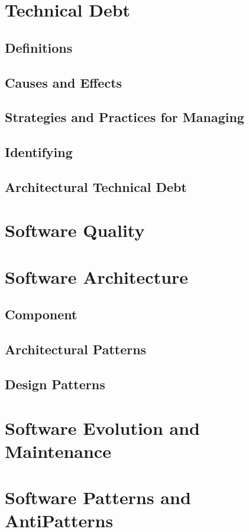 \section{Technical Debt}
\subsection{Definitions}
\subsection{Causes and Effects}
\subsection{Strategies and Practices for Managing}
\subsection{Identifying}
\subsection{Architectural Technical Debt}


\section{Software Quality}

\section{Software Architecture}
\subsection{Component}
\subsection{Architectural Patterns}
\subsection{Design Patterns}

\section{Software Evolution and Maintenance}

\section{Software Patterns and AntiPatterns}

